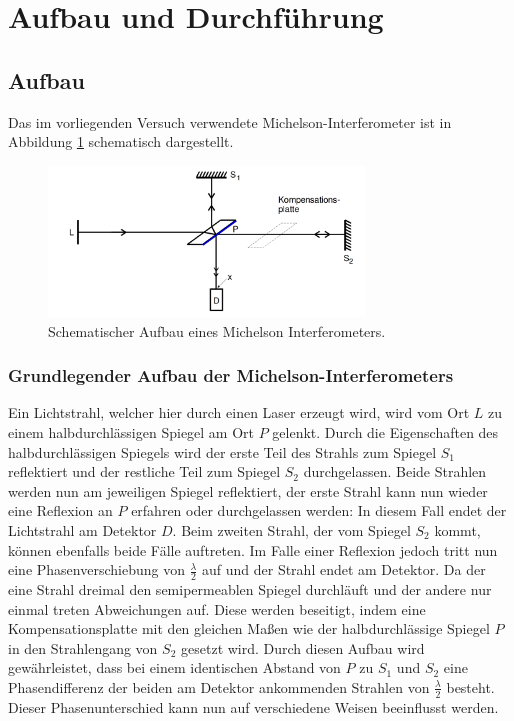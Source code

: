 \section{Aufbau und Durchführung}
\subsection{Aufbau}
\label{sec:Aufbau}

Das im vorliegenden Versuch verwendete Michelson-Interferometer ist in Abbildung \ref{abb:2} schematisch dargestellt.
\begin{figure}[H]
  \centering
  \includegraphics[height=4cm]{ressources/aufbau1.png}
  \caption{Schematischer Aufbau eines Michelson Interferometers. \cite{Quelle0}}
  \label{abb:2}
\end{figure}

\subsubsection{Grundlegender Aufbau der Michelson-Interferometers}
Ein Lichtstrahl, welcher hier durch einen Laser erzeugt wird, wird vom Ort $L$ zu einem halbdurchlässigen Spiegel am Ort $P$ gelenkt.
Durch die Eigenschaften des halbdurchlässigen Spiegels wird der erste Teil des Strahls zum Spiegel $S_1$ reflektiert und der restliche Teil zum Spiegel $S_2$ durchgelassen.
Beide Strahlen werden nun am jeweiligen Spiegel reflektiert, der erste Strahl kann nun wieder eine Reflexion an $P$ erfahren oder durchgelassen werden: In diesem Fall endet der Lichtstrahl am Detektor $D$.
Beim zweiten Strahl, der vom Spiegel $S_2$ kommt, können ebenfalls beide Fälle auftreten.
Im Falle einer Reflexion jedoch tritt nun eine Phasenverschiebung von $\frac{\lambda}{2}$ auf und der Strahl endet am Detektor.
Da der eine Strahl dreimal den semipermeablen Spiegel durchläuft und der andere nur einmal treten Abweichungen auf.
Diese werden beseitigt, indem eine Kompensationsplatte mit den gleichen Maßen wie der halbdurchlässige Spiegel $P$ in den Strahlengang von $S_2$ gesetzt wird.
Durch diesen Aufbau wird gewährleistet, dass bei einem identischen Abstand von $P$ zu $S_1$ und $S_2$ eine Phasendifferenz der beiden am Detektor ankommenden Strahlen von $\frac{\lambda}{2}$ besteht.
Dieser Phasenunterschied kann nun auf verschiedene Weisen beeinflusst werden.


